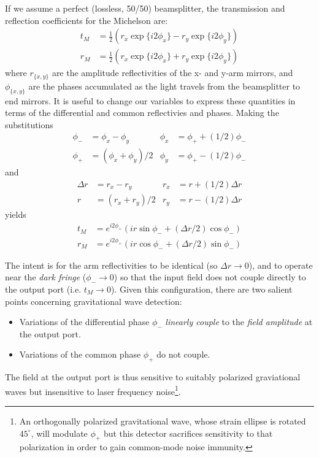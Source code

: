 If we assume a perfect (lossless, 50/50) beamsplitter, the
transmission and reflection coefficients for the Michelson are:
%
\begin{align}
t_M  &= \frac{1}{2}\left(r_x \exp \{i2\phi_x\} - r_y \exp\{i2\phi_y\} \right) \\
r_M  &= \frac{1}{2}\left(r_x \exp \{i2\phi_x\} + r_y \exp\{i2\phi_y\} \right)
\end{align}
where $r_{\{x,y\}}$ are the amplitude reflectivities of the x- and y-arm mirrors, and $\phi_{\{x,y\}}$ are 
the phases accumulated as the light travels from the beamsplitter to end mirrors.  It is useful to change
our variables to express these quantities in terms of the differential and common reflectivies and phases.
Making the substitutions
\begin{align}
\phi_- &= \phi_x - \phi_y       &  \phi_x &= \phi_+ + (1/2)\phi_- \\
\phi_+ &= (\phi_x + \phi_y)/2   &  \phi_y &= \phi_+ - (1/2)\phi_-
\end{align}
and
\begin{align}
  \Delta r & = r_x - r_y        &  r_x   &= r + (1/2)\Delta r \\
       r & = (r_x + r_y)/2      &  r_y   &= r - (1/2)\Delta r
\end{align}
yields
\begin{align}
t_M  &= e^{i2\phi_+} \left( i r\sin \phi_- + (\Delta r/2) \cos \phi_- \right) 
\label{eq:michelson-transmission}\\
r_M  &= e^{i2\phi_+} \left( i r \cos \phi_- + (\Delta r/2) \sin \phi_- \right) 
\end{align}

The intent is for the arm reflectivities to be identical (so $\Delta r \to
0$), and to operate near the \emph{dark fringe} ($\phi_-\to0$) so that
the input field does not couple directly to the output port
(i.e. $t_M\to0$).  Given this configuration, there are two salient
points concerning gravitational wave detection:
%
\begin{itemize}
\item Variations of the differential phase $\phi_-$ \emph{linearly couple} to the \emph{field amplitude} at the output port.
\item Variations of the common phase $\phi_+$ do not couple.
\end{itemize}
%
The field at the output port is thus sensitive to suitably
polarized graviational waves but insensitive to laser frequency noise\footnote{An orthogonally polarized gravitational wave, whose strain ellipse is
rotated $45^\circ$, will modulate $\phi_+$ but this detector
sacrifices sensitivity to that polarization in order to gain
common-mode noise immunity.}. 

